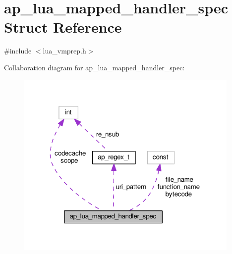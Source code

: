 \hypertarget{structap__lua__mapped__handler__spec}{}\section{ap\+\_\+lua\+\_\+mapped\+\_\+handler\+\_\+spec Struct Reference}
\label{structap__lua__mapped__handler__spec}


{\ttfamily \#include $<$lua\+\_\+vmprep.\+h$>$}



Collaboration diagram for ap\+\_\+lua\+\_\+mapped\+\_\+handler\+\_\+spec\+:
\nopagebreak
\begin{figure}[H]
\begin{center}
\leavevmode
\includegraphics[width=307pt]{structap__lua__mapped__handler__spec__coll__graph}
\end{center}
\end{figure}
